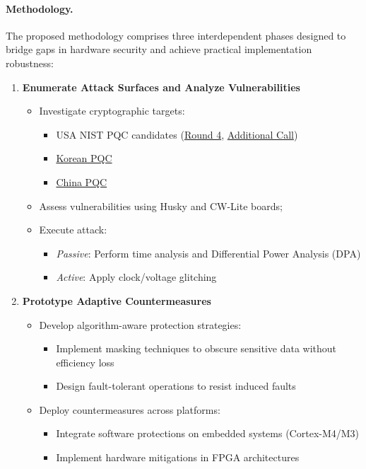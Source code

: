 \documentclass[11pt, a4paper]{article}
\begin{document}
\paragraph{Methodology.} The proposed methodology comprises three 
interdependent phases designed to bridge gaps 
in hardware security and achieve practical implementation robustness:


\begin{enumerate}
\item \textbf{Enumerate Attack Surfaces and Analyze Vulnerabilities} 
\begin{itemize}[leftmargin=2em] 
\item Investigate cryptographic targets: 
\begin{itemize} \item USA NIST PQC candidates 
(\href{https://csrc.nist.gov/projects/post-quantum-cryptography/round-4-submissions}{Round 4}, 
\href{https://csrc.nist.gov/projects/pqc-dig-sig/round-2-additional-signatures}{Additional Call}) 
\item \href{https://www.kpqc.or.kr/competition.html}{Korean PQC} 
\item \href{https://niccs.org.cn/en/notice/}{China PQC} 
\end{itemize} 
\item Assess vulnerabilities using Husky and CW-Lite boards; 
\item Execute attack: 
    \begin{itemize} 
    \item \textit{Passive}: Perform time analysis and Differential Power Analysis (DPA) 
    \item \textit{Active}: Apply clock/voltage glitching 
    \end{itemize} 
\end{itemize}

\item \textbf{Prototype Adaptive Countermeasures}
\begin{itemize}[leftmargin=2em]
    \item Develop algorithm-aware protection strategies:
    \begin{itemize}
        \item Implement masking techniques to obscure sensitive data without efficiency loss
        \item Design fault-tolerant operations to resist induced faults
    \end{itemize}
    \item Deploy countermeasures across platforms:
    \begin{itemize}
        \item Integrate software protections on embedded systems (Cortex-M4/M3)
        \item Implement hardware mitigations in FPGA architectures
    \end{itemize}
\end{itemize}


\end{enumerate}
\end{document}

